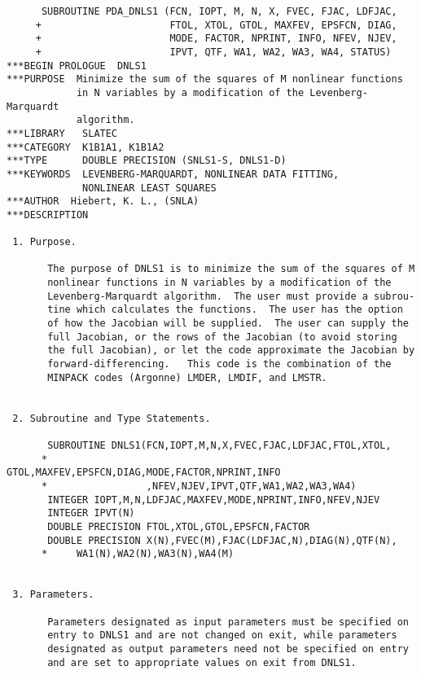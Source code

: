 \begin{verbatim}
      SUBROUTINE PDA_DNLS1 (FCN, IOPT, M, N, X, FVEC, FJAC, LDFJAC,
     +                      FTOL, XTOL, GTOL, MAXFEV, EPSFCN, DIAG,
     +                      MODE, FACTOR, NPRINT, INFO, NFEV, NJEV,
     +                      IPVT, QTF, WA1, WA2, WA3, WA4, STATUS)
***BEGIN PROLOGUE  DNLS1
***PURPOSE  Minimize the sum of the squares of M nonlinear functions
            in N variables by a modification of the Levenberg-Marquardt
            algorithm.
***LIBRARY   SLATEC
***CATEGORY  K1B1A1, K1B1A2
***TYPE      DOUBLE PRECISION (SNLS1-S, DNLS1-D)
***KEYWORDS  LEVENBERG-MARQUARDT, NONLINEAR DATA FITTING,
             NONLINEAR LEAST SQUARES
***AUTHOR  Hiebert, K. L., (SNLA)
***DESCRIPTION

 1. Purpose.

       The purpose of DNLS1 is to minimize the sum of the squares of M
       nonlinear functions in N variables by a modification of the
       Levenberg-Marquardt algorithm.  The user must provide a subrou-
       tine which calculates the functions.  The user has the option
       of how the Jacobian will be supplied.  The user can supply the
       full Jacobian, or the rows of the Jacobian (to avoid storing
       the full Jacobian), or let the code approximate the Jacobian by
       forward-differencing.   This code is the combination of the
       MINPACK codes (Argonne) LMDER, LMDIF, and LMSTR.


 2. Subroutine and Type Statements.

       SUBROUTINE DNLS1(FCN,IOPT,M,N,X,FVEC,FJAC,LDFJAC,FTOL,XTOL,
      *                 GTOL,MAXFEV,EPSFCN,DIAG,MODE,FACTOR,NPRINT,INFO
      *                 ,NFEV,NJEV,IPVT,QTF,WA1,WA2,WA3,WA4)
       INTEGER IOPT,M,N,LDFJAC,MAXFEV,MODE,NPRINT,INFO,NFEV,NJEV
       INTEGER IPVT(N)
       DOUBLE PRECISION FTOL,XTOL,GTOL,EPSFCN,FACTOR
       DOUBLE PRECISION X(N),FVEC(M),FJAC(LDFJAC,N),DIAG(N),QTF(N),
      *     WA1(N),WA2(N),WA3(N),WA4(M)


 3. Parameters.

       Parameters designated as input parameters must be specified on
       entry to DNLS1 and are not changed on exit, while parameters
       designated as output parameters need not be specified on entry
       and are set to appropriate values on exit from DNLS1.


\end{verbatim}
